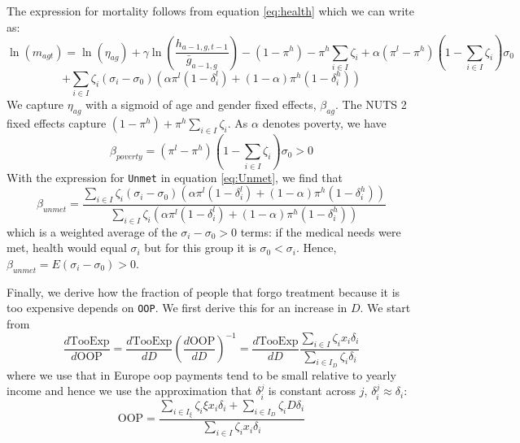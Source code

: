 \documentclass[a4paper,12pt]{article}
\begin{document}
The expression for mortality follows from equation \eqref{eq:health} which we can write as:
\begin{equation}
\ln(m_{agt}) = \ln({\eta}_{ag}) + \gamma \ln \left( \frac{h_{a-1,g,t-1}}{\bar g_{a-1,g}}\right)- (1-\pi^h)-\pi^h \sum_{i \in I} \zeta_i + \alpha (\pi^l-\pi^h)(1-\sum_{i \in I} \zeta_i) \sigma_0
 \end{equation}
\begin{equation*}
+ \sum_{i \in I} \zeta_i (\sigma_i-\sigma_0) (\alpha \pi^l (1-\delta_i^l) + (1-\alpha) \pi^h (1-\delta_i^h))
\end{equation*}
We capture \({\eta}_{ag}\) with a sigmoid of age and gender fixed effects, \(\beta_{ag}\). The NUTS 2 fixed effects capture \((1-\pi^h)+\pi^h \sum_{i \in I} \zeta_i\). As \(\alpha\) denotes poverty, we have
\begin{equation}
\beta_{poverty} = (\pi^l-\pi^h)(1-\sum_{i \in I} \zeta_i) \sigma_0 > 0
\end{equation}
With the expression for \texttt{Unmet} in equation \eqref{eq:Unmet}, we find that
\begin{equation}
\beta_{unmet} = \frac{\sum_{i \in I} \zeta_i (\sigma_i-\sigma_0) (\alpha \pi^l (1-\delta_i^l) + (1-\alpha) \pi^h (1-\delta_i^h))}{\sum_{i \in I} \zeta_i (\alpha \pi^l (1-\delta_i^l) + (1-\alpha) \pi^h (1-\delta_i^h))}
\end{equation}
which is a weighted average of the \(\sigma_i-\sigma_0>0\) terms: if the medical needs were met, health would equal \(\sigma_i\) but for this group it is \(\sigma_0 < \sigma_{i}\). Hence, \(\beta_{unmet} = E(\sigma_i-\sigma_0)>0\).

Finally, we derive how the fraction of people that forgo treatment because it is too expensive depends on \texttt{OOP}. We first derive this for an increase in \(D\). We start from
\begin{equation}
\label{eq:TooExp_OOP}
\frac{d \text{TooExp}}{d \text{OOP}} = \frac{d \text{TooExp}}{dD} \left( \frac{d \text{OOP}}{d D}
  \right)^{-1} = \frac{d \text{TooExp}}{dD} \frac{\sum_{i \in I} \zeta_i x_i \delta_i}{\sum_{i \in I_D} \zeta_i \delta_i}
\end{equation}
where we use that in Europe oop payments tend to be small relative to yearly income and hence we use the approximation that \(\delta^j_i\) is constant across \(j\), \(\delta^{j}_i \approx \delta_{i}\):
\begin{equation}
\label{eq:OOP2_app}
\text{OOP} = \frac{\sum_{i \in I_{\xi}} \zeta_i \xi x_i \delta_i+ \sum_{i \in I_D} \zeta_i D \delta_i}{\sum_{i \in I} \zeta_i x_i \delta_i}
\end{equation}
\end{document}
